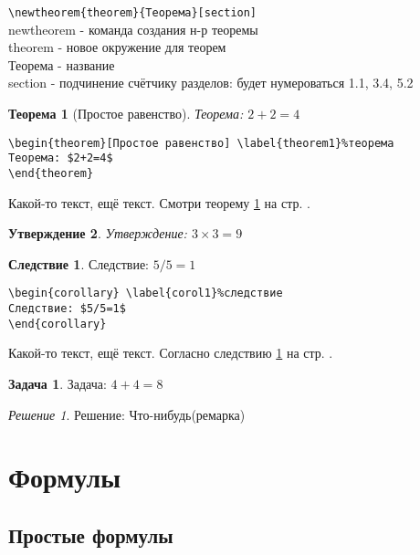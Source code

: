 \documentclass[a4paper,12pt]{article}%
\theoremstyle{plain}%
\newtheorem{theorem}{Теорема}[section]%
\newtheorem{proposition}[theorem]{Утверждение}%
\theoremstyle{definition}%
\newtheorem{corollary}{Следствие}[theorem]%
\newtheorem{problem}{Задача}[section]
\theoremstyle{remark}%
\newtheorem*{nonum}{Решение}
\begin{document}
\verb|\newtheorem{theоrem}{Теорема}[section]| \\%
newtheorem - команда создания н-р теоремы \\
theorem - новое окружение для теорем \\
Теорема - название \\
section - подчинение счётчику разделов: будет нумероваться 1.1, 3.4, 5.2

\begin{theorem}[Простое равенство] \label{theorem1}%
Теорема: $2+2=4$
\end{theorem}

\begin{verbatim}
\begin{theorem}[Простое равенство] \label{theorem1}%теорема
Теорема: $2+2=4$
\end{theorem}
\end{verbatim}

Какой-то текст, ещё текст. Смотри теорему \ref{theorem1} на стр. \pageref{theorem1}.

\begin{proposition}%
Утверждение: $3\times3=9$
\end{proposition}

\begin{corollary} \label{corol1}%
Следствие: $5/5=1$
\end{corollary}

\begin{verbatim}
\begin{corollary} \label{corol1}%следствие
Следствие: $5/5=1$
\end{corollary}
\end{verbatim}

Какой-то текст, ещё текст. Согласно следствию \ref{corol1} на стр. \pageref{corol1}.

\begin{problem}%
Задача: $4+4=8$
\end{problem}

\begin{nonum}%
Решение: Что-нибудь(ремарка)
\end{nonum}




\section{Формулы}
\subsection{Простые формулы}
\end{document}
